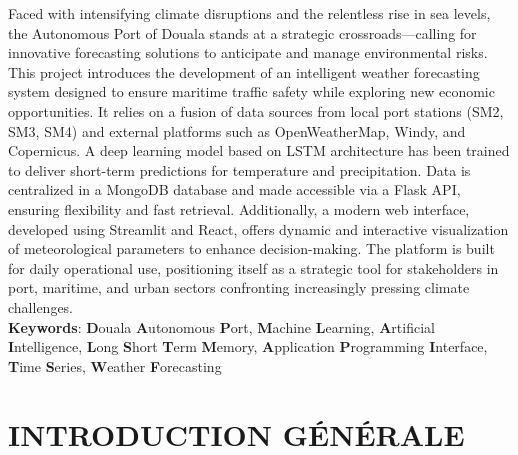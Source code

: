 \documentclass[a4paper,12pt,openany]{report}
\begin{document}
	\quad Faced with intensifying climate disruptions and the relentless rise in sea levels, the Autonomous Port of Douala stands at a strategic crossroads—calling for innovative forecasting solutions to anticipate and manage environmental risks.
	This project introduces the development of an intelligent weather forecasting system designed to ensure maritime traffic safety while exploring new economic opportunities. It relies on a fusion of data sources from local port stations (SM2, SM3, SM4) and external platforms such as OpenWeatherMap, Windy, and Copernicus.
	A deep learning model based on LSTM architecture has been trained to deliver short-term predictions for temperature and precipitation. Data is centralized in a MongoDB database and made accessible via a Flask API, ensuring flexibility and fast retrieval. Additionally, a modern web interface, developed using Streamlit and React, offers dynamic and interactive visualization of meteorological parameters to enhance decision-making.
	The platform is built for daily operational use, positioning itself as a strategic tool for stakeholders in port, maritime, and urban sectors confronting increasingly pressing climate challenges.
	\\
	
	
		\textbf{Keywords}: \textbf{D}ouala \textbf{A}utonomous \textbf{P}ort, \textbf{M}achine \textbf{L}earning, \textbf{A}rtificial \textbf{I}ntelligence, \textbf{L}ong \textbf{S}hort \textbf{T}erm \textbf{M}emory, \textbf{A}pplication \textbf{P}rogramming \textbf{I}nterface, \textbf{T}ime \textbf{S}eries, \textbf{W}eather \textbf{F}orecasting
	
	\clearpage {}

 \newpage{}

\chapter*{INTRODUCTION GÉNÉRALE }
\label{chap:intro}
\end{document}
